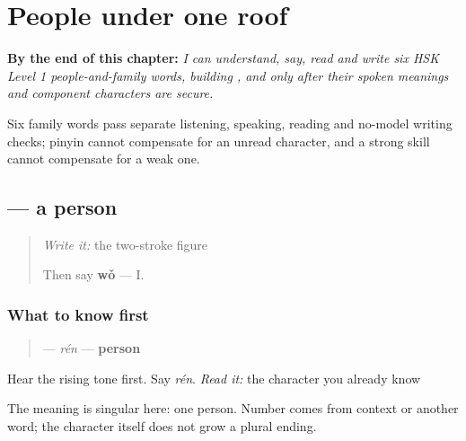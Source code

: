 
\chapter{People under one roof}
\label{ch:zh-family-six}

\begin{chapteropening}
\textbf{By the end of this chapter:} \emph{I can understand, say, read and write six HSK Level 1 people-and-family words, building ,  and  only after their spoken meanings and component characters are secure.}

Six family words pass separate listening, speaking, reading and no-model writing checks; pinyin cannot compensate for an unread character, and a strong skill cannot compensate for a weak one.
\end{chapteropening}

\section[\texorpdfstring{\zh{人} (rén)}{人 (rén)}]{ — a person}

\label{lesson:ZH-C12-ren}



\begin{quote}
\emph{Write it:} the two-stroke figure

Then say \textbf{wǒ} — I.
\end{quote}

\subsection*{What to know first}
\begin{quote}
\textbf{} — \emph{rén} — \textbf{person}
\end{quote}

Hear the rising tone first. Say \emph{rén}. \emph{Read it:} the character you already know

The meaning is singular here: one person. Number comes from context or another word; the character itself does not grow a plural ending.

